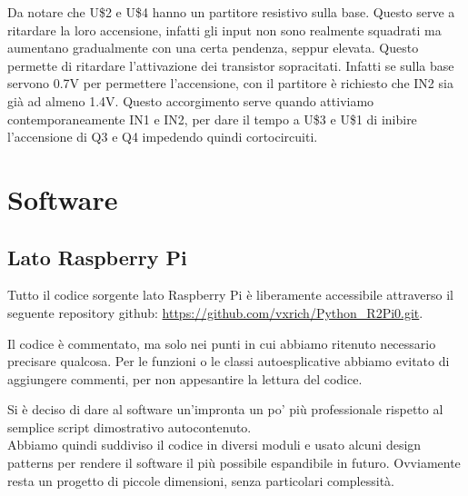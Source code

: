\documentclass[12pt]{article}
\begin{document}
Da notare che U\$2 e U\$4 hanno un partitore resistivo sulla base. Questo serve a ritardare la loro accensione, infatti gli input non sono realmente squadrati ma aumentano gradualmente con una certa pendenza, seppur elevata. Questo permette di ritardare l'attivazione dei transistor sopracitati. Infatti se sulla base servono 0.7V per permettere l'accensione, con il partitore è richiesto che IN2 sia già ad almeno 1.4V. Questo accorgimento serve quando attiviamo contemporaneamente IN1 e IN2, per dare il tempo a U\$3 e U\$1 di inibire l'accensione di Q3 e Q4 impedendo quindi cortocircuiti.

\section{Software}

\subsection{Lato Raspberry Pi}

Tutto il codice sorgente lato Raspberry Pi è liberamente accessibile attraverso il seguente repository github: \url{https://github.com/vxrich/Python_R2Pi0.git}.

Il codice è commentato, ma solo nei punti in cui abbiamo ritenuto necessario precisare qualcosa. Per le funzioni o le classi autoesplicative abbiamo evitato di aggiungere commenti, per non appesantire la lettura del codice.

Si è deciso di dare al software un'impronta un po' più professionale rispetto al semplice script dimostrativo autocontenuto.\\
Abbiamo quindi suddiviso il codice in diversi moduli e usato alcuni design patterns per rendere il software il più possibile espandibile in futuro. Ovviamente resta un progetto di piccole dimensioni, senza particolari complessità.
\end{document}
